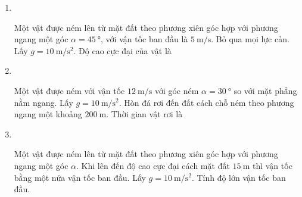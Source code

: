 \begin{enumerate}[label=\bfseries Câu \arabic*:,leftmargin=1.5cm]
{}

\item {}\\
{Một vật được ném lên từ mặt đất theo phương xiên góc hợp với phương ngang một góc $\alpha =\SI{45}{\degree}$, với vận tốc ban đầu là $\SI{5}{\meter/\second}$. Bỏ qua mọi lực cản. Lấy $g = \SI{10}{\meter/\second^2}$. Độ cao cực đại của vật là
}

\item  {}\\
{Một vật được ném với vận tốc $\SI{12}{\meter/\second}$  với góc ném $\alpha=\SI{30}{\degree}$ so với mặt phẳng nằm ngang. Lấy $g = \SI{10}{\meter/\second^2}$. Hòn đá rơi đến đất cách chỗ ném theo phương ngang một khoảng $\SI{200}{\meter}$. Thời gian vật rơi là
}

\item {}\\
{Một vật được ném lên từ mặt đất theo phương xiên góc hợp với phương ngang một góc $\alpha$. Khi lên đến độ cao cực đại cách mặt đất $\SI{15}{\meter}$ thì vận tốc bằng một nửa vận tốc ban đầu. Lấy $g =\SI{10}{\meter/\second^2}$. Tính độ lớn vận tốc ban đầu.
	\begin{mcq}(4)
		\item $\SI{18}{\meter/\second}$.
		\item $\SI{20}{\meter/\second}$.
		\item $\SI{15}{\meter/\second}$.
		\item $\SI{25}{\meter/\second}$.
	\end{mcq}

}
\end{enumerate}
